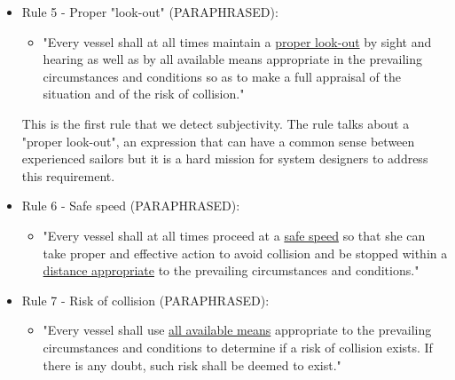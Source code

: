     \begin{itemize}
    

        \item Rule 5 - Proper "look-out" (PARAPHRASED):
        
        \begin{itemize}
            \item "Every vessel shall at all times maintain a \underline{proper look-out} by sight and hearing as well as by all available means appropriate in the prevailing circumstances and conditions so as to make a full appraisal of the situation and of the risk of collision."
        \end{itemize}
        
        This is the first rule that we detect subjectivity. The rule talks about a "proper look-out", an expression that can have a common sense between experienced sailors but it is a hard mission for system designers to address this requirement.
        
        \item Rule 6 - Safe speed (PARAPHRASED):
        
        \begin{itemize}
            \item "Every vessel shall at all times proceed at a \underline{safe speed} so that she can take proper and effective action to avoid collision and be stopped within a \underline{distance appropriate} to the prevailing circumstances and conditions."
        \end{itemize}
        
        \item Rule 7 - Risk of collision (PARAPHRASED):
        
        \begin{itemize}
            \item "Every vessel shall use \underline{all available means} appropriate to the prevailing circumstances and conditions to determine if a risk of collision exists. If there is any doubt, such risk shall be deemed to exist."
        \end{itemize}
        

\end{itemize}
